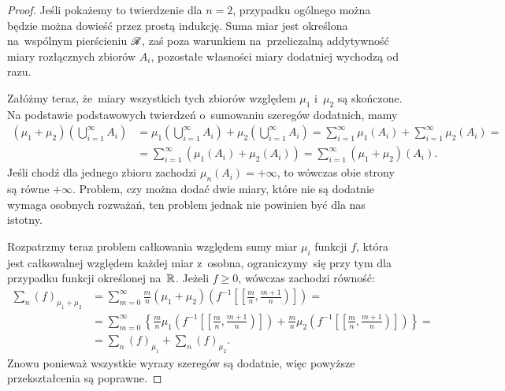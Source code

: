 \documentclass[a4paper,11pt]{article}
\begin{document}
\begin{proof}

  Jeśli pokażemy to twierdzenie dla $n = 2$, przypadku ogólnego można
  będzie można dowieść przez prostą indukcję. Suma miar jest określona
  na~wspólnym pierścieniu $\mathcal{R}$, zaś poza warunkiem na~przeliczalną
  addytywność miary rozłącznych zbiorów $A_{ i }$, pozostałe własności
  miary dodatniej wychodzą od razu.

  Załóżmy teraz, że~miary wszystkich tych zbiorów względem $\mu_{ 1 }$
  i~$\mu_{ 2 }$ są skończone. Na podstawie podstawowych twierdzeń
  o~sumowaniu szeregów dodatnich, mamy
  \begin{equation}
    \label{eq:RS-Vol-I-s01-03}
    \begin{split}
      ( \mu_{ 1 } + \mu_{ 2 } )\left( \bigcup_{ i = 1 }^{ \infty } A_{ i } \right)
      &=
        \mu_{ 1 }\left( \bigcup_{ i = 1 }^{ \infty } A_{ i } \right)
        + \mu_{ 2 }\left( \bigcup_{ i = 1 }^{ \infty } A_{ i } \right)
        =
        \sum_{ i = 1 }^{ \infty } \mu_{ 1 }( A_{ i } )
        + \sum_{ i = 1 }^{ \infty } \mu_{ 2 }( A_{ i } ) = \\
      &=
        \sum_{ i = 1 }^{ \infty } \left( \mu_{ 1 }( A_{ i } ) + \mu_{ 2 }( A_{ i } )
        \right)
        = \sum_{ i = 1 }^{ \infty } ( \mu_{ 1 } + \mu_{ 2 } )( A_{ i } ).
    \end{split}
  \end{equation}
  Jeśli chodź dla jednego zbioru zachodzi
  $\mu_{ n }( A_{ i } ) = +\infty$, to wówczas obie strony są równe
  $+\infty$. Problem, czy można dodać dwie miary, które nie są
  dodatnie wymaga osobnych rozważań, ten problem jednak nie powinien
  być dla nas istotny.

  Rozpatrzmy teraz problem całkowania względem sumy miar $\mu_{ i }$
  funkcji $f$, która jest całkowalnej względem każdej miar z~osobna,
  ograniczymy~się przy tym dla przypadku funkcji określonej na~$\mathbb{R}$.
  Jeżeli $f \geq 0$, wówczas zachodzi równość:
  \begin{equation}
    \label{eq:RS-Vol-I-s01-04}
    \begin{split}
      \sum_{ n }( f )_{ \mu_{ 1 } + \mu_{ 2 } }
      &=
        \sum_{ m = 0 }^{ \infty } \frac{ m }{ n } ( \mu_{ 1 } + \mu_{ 2 } )
        \left( f^{ -1 }\left[ \left[ \tfrac{ m }{ n },
        \tfrac{ m + 1 }{ n } \right) \right] \right) = \\
      &=
        \sum_{ m = 0 }^{ \infty } \left\{ \frac{ m }{ n } \mu_{ 1 }\left(
        f^{ -1 }\left[ \left[ \tfrac{ m }{ n }, \tfrac{ m + 1 }{ n }
        \right) \right] \right) \right.
        + \left. \frac{ m }{ n } \mu_{ 2 }\left(
        f^{ -1 }\left[ \left[ \tfrac{ m }{ n }, \tfrac{ m + 1 }{ n }
        \right) \right] \right) \right\} = \\
      &=
        \sum_{ n }( f )_{ \mu_{ 1 } } + \sum_{ n }( f )_{ \mu_{ 2 } }.
    \end{split}
  \end{equation}
  Znowu ponieważ wszystkie wyrazy szeregów są dodatnie, więc powyższe
  przekształcenia są poprawne.


\end{proof}
\end{document}
